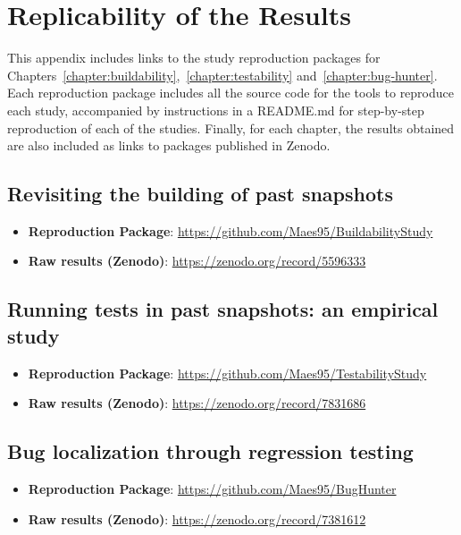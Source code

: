 \chapter{Replicability of the Results}
\label{appendix:replicability}

This appendix includes links to the study reproduction packages for Chapters~\ref{chapter:buildability},~\ref{chapter:testability} and~\ref{chapter:bug-hunter}. 
Each reproduction package includes all the source code for the tools to reproduce each study, accompanied by instructions in a README.md for step-by-step reproduction of each of the studies. 
Finally, for each chapter, the results obtained are also included as links to packages published in Zenodo.

\section{Revisiting the building of past snapshots}
\label{sec:buildability:repro}

\begin{itemize}[]
    \item \textbf{Reproduction Package}: \url{https://github.com/Maes95/BuildabilityStudy}
    \item \textbf{Raw results (Zenodo)}: \url{https://zenodo.org/record/5596333}
\end{itemize}

\section{Running tests in past snapshots: an empirical study}
\label{sec:testability:repro}

\begin{itemize}[]
    \item \textbf{Reproduction Package}: \url{https://github.com/Maes95/TestabilityStudy}
    \item \textbf{Raw results (Zenodo)}: \url{https://zenodo.org/record/7831686}
\end{itemize}

\section{Bug localization through regression testing}
\label{sec:bug-hunter:repro}

\begin{itemize}[]
    \item \textbf{Reproduction Package}: \url{https://github.com/Maes95/BugHunter}
    \item \textbf{Raw results (Zenodo)}: \url{https://zenodo.org/record/7381612}
\end{itemize}